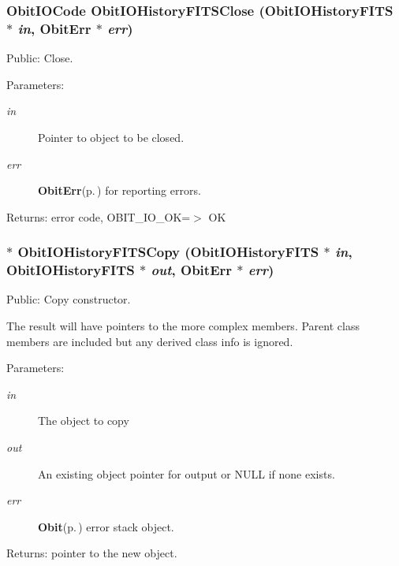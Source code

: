 \subsubsection{\setlength{\rightskip}{0pt plus 5cm}Obit\-IOCode Obit\-IOHistory\-FITSClose ({\bf Obit\-IOHistory\-FITS} $\ast$ {\em in}, {\bf Obit\-Err} $\ast$ {\em err})}\label{ObitIOHistoryFITS_8c_a13}


Public: Close. 

\begin{Desc}
\item[Parameters:]
\begin{description}
\item[{\em in}]Pointer to object to be closed. \item[{\em err}]{\bf Obit\-Err}{\rm (p.\,\pageref{structObitErr})} for reporting errors. \end{description}
\end{Desc}
\begin{Desc}
\item[Returns:]error code, OBIT\_\-IO\_\-OK=$>$ OK \end{Desc}
\subsubsection{$\ast$ Obit\-IOHistory\-FITSCopy ({\bf Obit\-IOHistory\-FITS} $\ast$ {\em in}, {\bf Obit\-IOHistory\-FITS} $\ast$ {\em out}, {\bf Obit\-Err} $\ast$ {\em err})}\label{ObitIOHistoryFITS_8c_a11}


Public: Copy constructor. 

The result will have pointers to the more complex members. Parent class members are included but any derived class info is ignored. \begin{Desc}
\item[Parameters:]
\begin{description}
\item[{\em in}]The object to copy \item[{\em out}]An existing object pointer for output or NULL if none exists. \item[{\em err}]{\bf Obit}{\rm (p.\,\pageref{structObit})} error stack object. \end{description}
\end{Desc}
\begin{Desc}
\item[Returns:]pointer to the new object. \end{Desc}

